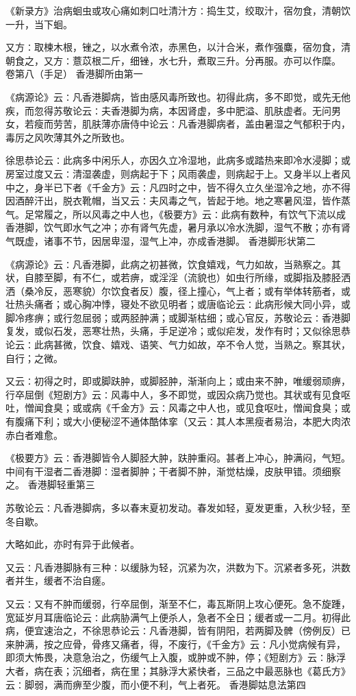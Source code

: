\documentclass[a4paper,12pt,UTF8,twoside]{ctexbook}
\begin{document}
《新录方》治病蛔虫或攻心痛如刺口吐清汁方∶捣生艾，绞取汁，宿勿食，清朝饮一升，当下蛔。

又方∶取楝木根，锉之，以水煮令浓，赤黑色，以汁合米，煮作强麋，宿勿食，清朝食之，又方∶薏苡根二斤，细锉，水七升，煮取三升。分再服。亦可以作糜。
卷第八（手足）
香港脚所由第一

《病源论》云∶凡香港脚病，皆由感风毒所致也。初得此病，多不即觉，或先无他疾，而忽得苏敬论云∶夫香港脚为病，本因肾虚，多中肥溢、肌肤虚者。无问男女，若瘦而劳苦，肌肤薄亦唐侍中论云∶凡香港脚病者，盖由暑湿之气郁积于内，毒厉之风吹薄其外之所致也。

徐思恭论云∶此病多中闲乐人，亦因久立冷湿地，此病多或踏热来即冷水浸脚；或房室过度又云∶清湿袭虚，则病起于下；风雨袭虚，则病起于上。又身半以上者风中之，身半已下者《千金方》云∶凡四时之中，皆不得久立久坐湿冷之地，亦不得因酒醉汗出，脱衣靴帽，当又云∶夫风毒之气，皆起于地。地之寒暑风湿，皆作蒸气。足常履之，所以风毒之中人也，《极要方》云∶此病有数种，有饮气下流以成香港脚，饮气即水气之冲；亦有肾气先虚，暑月承以冷水洗脚，湿气不散；亦有肾气既虚，诸事不节，因居卑湿，湿气上冲，亦成香港脚。
香港脚形状第二

《病源论》云∶凡香港脚，此病之初甚微，饮食嬉戏，气力如故，当熟察之。其状，自膝至脚，有不仁，或若痹，或淫淫（流貌也）如虫行所缘，或脚指及膝胫洒洒（桑冷反，恶寒貌）尔饮食者反）腹，径上撞心，气上者；或有举体转筋者，或壮热头痛者；或心胸冲悸，寝处不欲见明者；或唐临论云∶此病形候大同小异，或脚冷疼痹；或行忽屈弱；或两胫肿满；或脚渐枯细；或心官反，苏敬论云∶香港脚复发，或似石发，恶寒壮热，头痛，手足逆冷；或似疟发，发作有时；又似徐思恭论云∶此病甚微，饮食、嬉戏、语笑、气力如故，卒不令人觉，当熟之。察其状，自行；之微。

又云∶初得之时，即或脚趺肿，或脚胫肿，渐渐向上；或由来不肿，唯缓弱顽痹，行卒屈倒《短剧方》云∶风毒中人，多不即觉，或因众病乃觉也。其状或有见食呕吐，憎闻食臭；或或病《千金方》云∶风毒之中人也，或见食呕吐，憎闻食臭；或有腹痛下利；或大小便秘涩不通体酷体挛（又云∶其人本黑瘦者易治，本肥大肉浓赤白者难愈。

《极要方》云∶香港脚皆令人脚胫大肿，趺肿重闷。甚者上冲心，肿满闷，气短。中间有干湿者二香港脚∶湿者脚肿；干者脚不肿，渐觉枯燥，皮肤甲错。须细察之。
香港脚轻重第三

苏敬论云∶凡香港脚病，多以春末夏初发动。春发如轻，夏发更重，入秋少轻，至冬自歇。

大略如此，亦时有异于此候者。

又云∶凡香港脚脉有三种∶以缓脉为轻，沉紧为次，洪数为下。沉紧者多死，洪数者并生，缓者不治自瘥。

又云∶又有不肿而缓弱，行卒屈倒，渐至不仁，毒瓦斯阴上攻心便死。急不旋踵，宽延岁月耳唐临论云∶此病胁满气上便杀人，急者不全日；缓者或一二月。初得此病，便宜速治之，不徐思恭论云∶凡香港脚，皆有阴阳，若两脚及髀（傍例反）已来肿满，按之应骨，骨疼又痛者，得，不废行，《千金方》云∶凡小觉病候有异，即须大怖畏，决意急治之，伤缓气上入腹，或肿或不肿，停；《短剧方》云∶脉浮大者，病在表；沉细者，病在里；其脉浮大紧快者，三品之中最恶脉也《葛氏方》云∶脚弱，满而痹至少腹，而小便不利，气上者死。
香港脚姑息法第四
\end{document}
